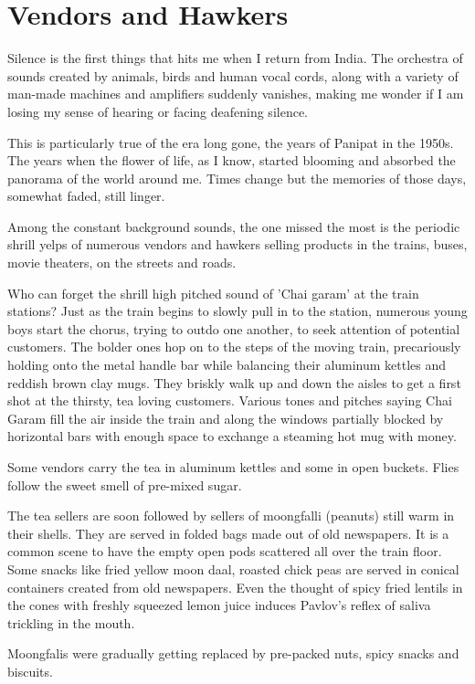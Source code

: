 \chapter{Vendors and Hawkers}
Silence is the first things that hits me when I return from India. The
orchestra of sounds created  by animals, birds and human vocal cords,
along with a variety of man-made machines and amplifiers suddenly
vanishes, making me wonder if I am losing my sense of hearing or facing
deafening silence. 

This is particularly true of the era long gone, the years of Panipat in
the 1950s. The years when the flower of life, as I know, started blooming
and absorbed the panorama of the world around me. Times change but the
memories of those days, somewhat faded, still linger. 

Among the constant background sounds, the one missed the most is the
periodic shrill yelps of numerous vendors and hawkers selling products in
the trains, buses, movie theaters, on the streets and roads. 

Who can forget the shrill high pitched sound of 'Chai garam' at the train
stations? Just as the train begins to slowly pull in to the station,
numerous young boys start the chorus, trying to outdo one another, to seek
attention of potential customers. The bolder ones hop on to the steps of
the moving train, precariously holding onto the metal handle bar while
balancing their aluminum kettles and reddish brown clay mugs. They briskly
walk up and down the aisles to get a first shot at the thirsty, tea loving
customers. Various tones and pitches saying Chai Garam fill the air inside
the train and along the windows partially blocked by horizontal bars with
enough space to exchange a steaming hot mug with money. 

Some vendors carry the tea in aluminum kettles and some in open buckets.
Flies follow the sweet smell of pre-mixed sugar. 

The tea sellers are soon followed by sellers of moongfalli (peanuts) still
warm in their shells. They are served in folded bags made out of old
newspapers. It is a common scene to have the empty open pods scattered all
over the train floor. Some snacks like fried yellow moon daal, roasted
chick peas are served in conical containers created from old newspapers.
Even the thought of spicy fried lentils in the cones with freshly squeezed
lemon juice induces Pavlov's reflex of saliva trickling in the mouth. 

Moongfalis were gradually getting replaced by pre-packed nuts, spicy
snacks and biscuits. 

